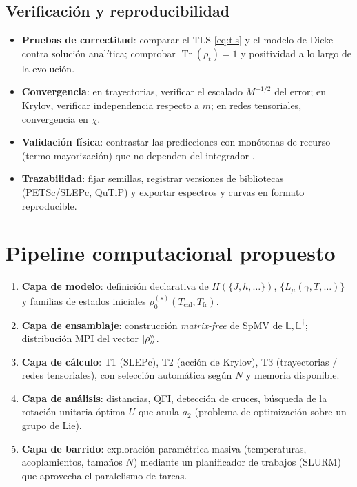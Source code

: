 \documentclass[11pt,a4paper]{article}
\theoremstyle{definition}
\theoremstyle{plain}
\renewcommand{\Tr}{\operatorname{Tr}}
\begin{document}
\subsection{Verificación y reproducibilidad}

\begin{itemize}[leftmargin=1.6em,itemsep=2pt]
\item \textbf{Pruebas de correctitud}: comparar el TLS \eqref{eq:tls} y el modelo de Dicke contra solución
analítica; comprobar $\Tr(\rho_t)=1$ y positividad a lo largo de la evolución.
\item \textbf{Convergencia}: en trayectorias, verificar el escalado $M^{-1/2}$ del error; en Krylov,
verificar independencia respecto a $m$; en redes tensoriales, convergencia en $\chi$.
\item \textbf{Validación física}: contrastar las predicciones con monótonas de recurso
(termo-mayorización) que no dependen del integrador \cite{Alyuruk2025,Summer2026}.
\item \textbf{Trazabilidad}: fijar semillas, registrar versiones de bibliotecas (PETSc/SLEPc, QuTiP) y
exportar espectros y curvas en formato reproducible.
\end{itemize}

\section{Pipeline computacional propuesto}

\begin{enumerate}[leftmargin=1.6em,itemsep=3pt]
\item \textbf{Capa de modelo}: definición declarativa de $H(\{J,h,\dots\})$, $\{L_\mu(\gamma,T,\dots)\}$ y
familias de estados iniciales $\rho_0^{(s)}(T_{\mathrm{cal}},T_{\mathrm{fr}})$.
\item \textbf{Capa de ensamblaje}: construcción \emph{matrix-free} de SpMV de $\mathbb{L},\mathbb{L}^{\dagger}$;
distribución MPI del vector $\ket{\rho}\!\rangle$.
\item \textbf{Capa de cálculo}: T1 (SLEPc), T2 (acción de Krylov), T3 (trayectorias / redes tensoriales),
con selección automática según $N$ y memoria disponible.
\item \textbf{Capa de análisis}: distancias, QFI, detección de cruces, búsqueda de la rotación unitaria
óptima $U$ que anula $a_2$ (problema de optimización sobre un grupo de Lie).
\item \textbf{Capa de barrido}: exploración paramétrica masiva (temperaturas, acoplamientos, tamaños $N$)
mediante un planificador de trabajos (SLURM) que aprovecha el paralelismo de tareas.
\end{enumerate}
\end{document}
